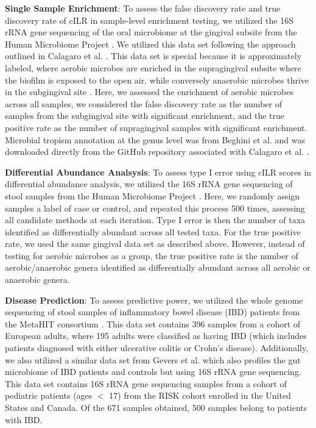 \documentclass[10pt,letterpaper]{article}
\begin{document}
\noindent \textbf{Single Sample Enrichment}: To assess the false discovery rate and true discovery rate of cILR in sample-level enrichment testing, we utilized the 16S rRNA gene sequencing of the oral microbiome at the gingival subsite from the Human Microbiome Project \cite{consortium2012, proctor2019}. We utilized this data set following the approach outlined in Calagaro et al. \cite{calgaro2020}. This data set is special because it is approximately labeled, where aerobic microbes are enriched in the supragingival subsite where the biofilm is exposed to the open air, while conversely anaerobic microbes thrive in the subgingival site \cite{thurnheer2016}. Here, we assessed the enrichment of aerobic microbes across all samples, we considered the false discovery rate as the number of samples from the subgingival site with significant enrichment, and the true positive rate as the number of supragingival samples with significant enrichment. Microbial tropism annotation at the genus level was from Beghini et al. \cite{beghini2019} and was downloaded directly from the GitHub repository associated with Calagaro et al. \cite{matteocalgaro2020}. 

\noindent \textbf{Differential Abundance Analsysis}: To assess type I error using cILR scores in differential abundance analysis, we utilized the 16S rRNA gene sequencing of stool samples from the Human Microbiome Project \cite{consortium2012, proctor2019}. Here, we randomly assign samples a label of case or control, and repeated this process 500 times, assessing all candidate methods at each iteration. Type I error is then the number of taxa identified as differentially abundant across all tested taxa. For the true positive rate, we used the same gingival data set as described above. However, instead of testing for aerobic microbes as a group, the true positive rate is the number of aerobic/anaerobic genera identified as differentially abundant across all aerobic or anaerobic genera. 

\noindent \textbf{Disease Prediction}: To assess predictive power, we utilized the whole genome sequencing of stool samples of inflammatory bowel disease (IBD) patients from the MetaHIT consortium \cite{nielsen2014}. This data set contains 396 samples from a cohort of European adults, where 195 adults were classified as having IBD (which includes patients diagnosed with either ulcerative colitis or Crohn's disease). Additionally, we also utilized a similar data set from Gevers et al. \cite{gevers2014} which also profiles the gut microbiome of IBD patients and controls but using 16S rRNA gene sequencing. This data set contains 16S rRNA gene sequencing samples from a cohort of pediatric patients (ages $<$ 17) from the RISK cohort enrolled in the United States and Canada. Of the 671 samples obtained, 500 samples belong to patients with IBD. 
\end{document}
